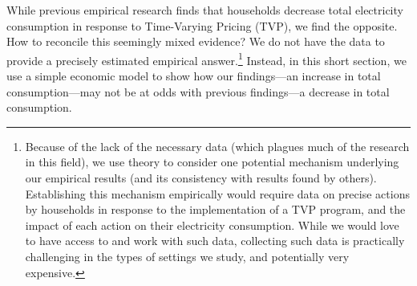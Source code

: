\documentclass[12pt]{article}
\begin{document}
While previous empirical research finds that households decrease total electricity consumption in response to Time-Varying Pricing (TVP), we find the opposite. How to reconcile this seemingly mixed evidence? We do not have the data to provide a precisely estimated empirical answer.\footnote{Because of the lack of the necessary data (which plagues much of the research in this field), we use theory to consider one potential mechanism underlying our empirical results (and its consistency with results found by others). Establishing this mechanism empirically would require data on precise actions by households in response to the implementation of a TVP program, and the impact of each action on their electricity consumption. While we would love to have access to and work with such data, collecting such data is practically challenging in the types of settings we study, and potentially very expensive.} Instead, in this short section, we use a simple economic model to show how our findings---an increase in total consumption---may not be at odds with previous findings---a decrease in total consumption.
\end{document}
